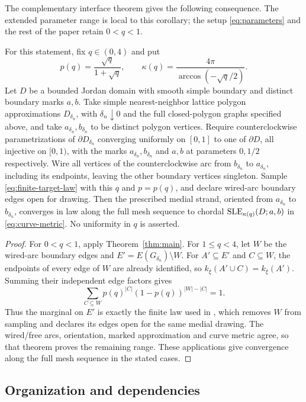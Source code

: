 The complementary interface theorem gives the following consequence. The extended parameter range is local to this corollary;
the setup \eqref{eq:parameters} and the rest of the paper retain $0<q<1$.

\begin{corollary}\label{cor:full-fk-range}
For this statement, fix $q\in(0,4)$ and put
\[
 p(q)=\frac{\sqrt q}{1+\sqrt q},
 \qquad \kappa(q)=\frac{4\pi}{\arccos(-\sqrt q/2)}.
\]
Let $D$ be a bounded Jordan domain with smooth simple boundary and
distinct boundary marks $a,b$. Take simple nearest-neighbor lattice
polygon approximations $D_{\delta_n}$, with $\delta_n\downarrow0$ and
the full closed-polygon graphs specified above, and take
$a_{\delta_n},b_{\delta_n}$ to be distinct polygon vertices.
Require counterclockwise parametrizations of $\partial D_{\delta_n}$
converging uniformly on $[0,1]$ to one of $\partial D$, all injective
on $[0,1)$, with the marks $a_{\delta_n},b_{\delta_n}$ and
$a,b$ at parameters $0,1/2$ respectively.
Wire all vertices of the counterclockwise arc from $b_{\delta_n}$ to
$a_{\delta_n}$, including its endpoints, leaving the other boundary
vertices singleton. Sample \eqref{eq:finite-target-law} with this $q$
and $p=p(q)$, and declare wired-arc boundary edges open for drawing.
Then the prescribed medial strand, oriented from $a_{\delta_n}$ to
$b_{\delta_n}$, converges in law along the full mesh sequence to
chordal $\operatorname{SLE}_{\kappa(q)}(D;a,b)$ in \eqref{eq:curve-metric}.
No uniformity in $q$ is asserted.
\end{corollary}
\begin{proof}
For $0<q<1$, apply Theorem~\ref{thm:main}.
For $1\le q<4$, let $W$
be the wired-arc boundary edges and $E'=E(G_{\delta_n})\setminus W$.
For $A'\subseteq E'$ and $C\subseteq W$, the endpoints of every edge
of $W$ are already identified, so $k_\xi(A'\cup C)=k_\xi(A')$.
Summing their independent edge factors gives
\[
 \sum_{C\subseteq W}p(q)^{|C|}(1-p(q))^{|W|-|C|}=1.
\]
Thus the marginal on $E'$ is exactly the finite law used in
\cite[Theorem~1.1(i)]{OpenAI2026FKInterfacesAboveOne}, which removes
$W$ from sampling and declares its edges open for the same medial
drawing. The wired/free arcs, orientation, marked approximation and
curve metric agree, so that theorem proves the remaining range.
These applications give convergence along the full mesh sequence in
the stated cases.
\end{proof}

\subsection{Organization and dependencies}

